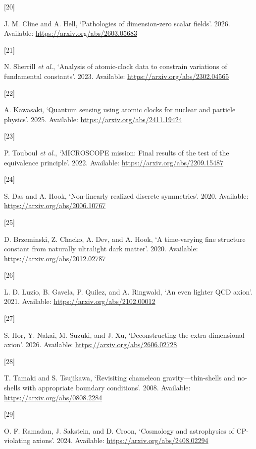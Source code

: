 \documentclass[
]{article}
\newlength{\cslhangindent}
\newlength{\csllabelwidth}
\newenvironment{CSLReferences}[2] %
 {\begin{list}{}{%
  \setlength{\itemindent}{0pt}
  \setlength{\leftmargin}{0pt}
  \setlength{\parsep}{0pt}
  \ifodd #1
   \setlength{\leftmargin}{\cslhangindent}
   \setlength{\itemindent}{-1\cslhangindent}
  \fi
  \setlength{\itemsep}{#2\baselineskip}}}
 {\end{list}}
\newcommand{\CSLLeftMargin}[1]{\parbox[t]{\csllabelwidth}{\strut#1\strut}}
\newcommand{\CSLRightInline}[1]{\parbox[t]{\linewidth - \csllabelwidth}{\strut#1\strut}}
\begin{document}
\begin{CSLReferences}{0}{0}
\CSLLeftMargin{{[}20{]} }%
\CSLRightInline{J. M. Cline and A. Hell, {`Pathologies of dimension-zero
scalar fields'}. 2026. Available:
\url{https://arxiv.org/abs/2603.05683}}

\CSLLeftMargin{{[}21{]} }%
\CSLRightInline{N. Sherrill \emph{et al.}, {`Analysis of atomic-clock
data to constrain variations of fundamental constants'}. 2023.
Available: \url{https://arxiv.org/abs/2302.04565}}

\CSLLeftMargin{{[}22{]} }%
\CSLRightInline{A. Kawasaki, {`Quantum sensing using atomic clocks for
nuclear and particle physics'}. 2025. Available:
\url{https://arxiv.org/abs/2411.19424}}

\CSLLeftMargin{{[}23{]} }%
\CSLRightInline{P. Touboul \emph{et al.}, {`MICROSCOPE mission: Final
results of the test of the equivalence principle'}. 2022. Available:
\url{https://arxiv.org/abs/2209.15487}}

\CSLLeftMargin{{[}24{]} }%
\CSLRightInline{S. Das and A. Hook, {`Non-linearly realized discrete
symmetries'}. 2020. Available: \url{https://arxiv.org/abs/2006.10767}}

\CSLLeftMargin{{[}25{]} }%
\CSLRightInline{D. Brzeminski, Z. Chacko, A. Dev, and A. Hook, {`A
time-varying fine structure constant from naturally ultralight dark
matter'}. 2020. Available: \url{https://arxiv.org/abs/2012.02787}}

\CSLLeftMargin{{[}26{]} }%
\CSLRightInline{L. D. Luzio, B. Gavela, P. Quilez, and A. Ringwald, {`An
even lighter QCD axion'}. 2021. Available:
\url{https://arxiv.org/abs/2102.00012}}

\CSLLeftMargin{{[}27{]} }%
\CSLRightInline{S. Hor, Y. Nakai, M. Suzuki, and J. Xu, {`Deconstructing
the extra-dimensional axion'}. 2026. Available:
\url{https://arxiv.org/abs/2606.02728}}

\CSLLeftMargin{{[}28{]} }%
\CSLRightInline{T. Tamaki and S. Tsujikawa, {`Revisiting chameleon
gravity---thin-shells and no-shells with appropriate boundary
conditions'}. 2008. Available: \url{https://arxiv.org/abs/0808.2284}}

\CSLLeftMargin{{[}29{]} }%
\CSLRightInline{O. F. Ramadan, J. Sakstein, and D. Croon, {`Cosmology
and astrophysics of CP-violating axions'}. 2024. Available:
\url{https://arxiv.org/abs/2408.02294}}


\end{CSLReferences}
\end{document}
